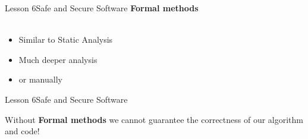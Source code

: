 \documentclass[aspectratio=1610]{beamer}
\begin{document}
\begin{frame}{Lesson 6}{Safe and Secure Software}
\LARGE
\textbf{Formal methods}\\~\\
\begin{itemize}
    \item Similar to Static Analysis
    \item Much deeper analysis
    \item or manually 
\end{itemize}
\end{frame}


\begin{frame}{Lesson 6}{Safe and Secure Software}
\Huge
\begin{center}
Without \textbf{Formal methods} we cannot guarantee the correctness of our algorithm
and code!
\end{center}
\end{frame}
\end{document}
